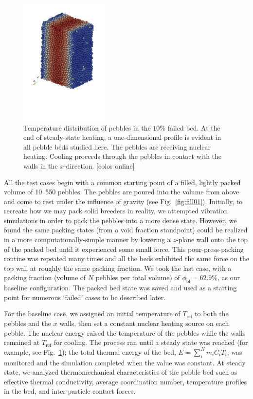 \begin{figure}[t]
	\centering
	\includegraphics[trim=1cm 8cm 3cm 4cm, width=0.4\textwidth]{chapters/figures/pebbleBedTemperature}
	\caption{Temperature distribution of pebbles in the $10\%$ failed bed. At the end of steady-state heating, a one-dimensional profile is evident in all pebble beds studied here. The pebbles are receiving nuclear heating. Cooling proceeds through the pebbles in contact with the walls in the $x$-direction. [color online]}
\label{fig:pebbleBedTemperature}
\end{figure}


All the test cases begin with a common starting point of a filled, lightly packed volume of 10~550 pebbles. The pebbles are poured into the volume from above and come to rest under the influence of gravity (see Fig.~\ref{fig:fill01}). Initially, to recreate how we may pack solid breeders in reality, we attempted vibration simulations in order to pack the pebbles into a more dense state. However, we found the same packing states (from a void fraction standpoint) could be realized in a more computationally-simple manner by lowering a $z$-plane wall onto the top of the packed bed until it experienced some small force. This pour-press-packing routine was repeated many times and all the beds exhibited the same force on the top wall at roughly the same packing fraction. We took the last case, with a packing fraction (volume of $N$ pebbles per total volume) of $\phi_\text{bl}= 62.9\%$, as our baseline configuration. The packed bed state was saved and used as a starting point for numerous `failed' cases to be described later.

For the baseline case, we assigned an initial temperature of $T_\text{ref}$ to both the pebbles and the $x$ walls, then set a constant nuclear heating source on each pebble. The nuclear energy raised the temperature of the pebbles while the walls remained at $T_\text{ref}$ for cooling. The process ran until a steady state was reached (for example, see Fig.~\ref{fig:pebbleBedTemperature}); the total thermal energy of the bed, $E =\sum_i^N m_iC_i T_i$, was monitored and the simulation completed when the value was constant. At steady state, we analyzed thermomechanical characteristics of the pebble bed such as effective thermal conductivity, average coordination number, temperature profiles in the bed, and inter-particle contact forces.

